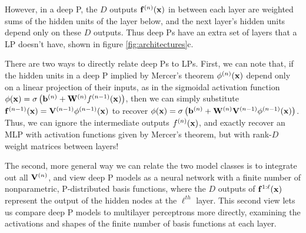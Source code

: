 \documentclass[twoside]{article}
\makeatletter
\newlength{\nonHumbleHeight}
\def\@humbleformat#1{{\settoheight{\nonHumbleHeight}{#1}\resizebox{!}{0.94\nonHumbleHeight}{#1}}}%
\def\humble#1{\@humbleformat{#1}}%
\newcommand{\gp}{{\humble GP}}
\newcommand{\MLP}{{\humble MLP}}
\makeatother
\begin{document}
However, in a deep \gp{}, the $D$ outputs ${\bf{f}}^{(n)}({\bf{x}})$ in between each layer are weighted sums of the hidden units of the layer below, and the next layer's hidden units depend only on these $D$ outputs.  Thus deep \gp{}s have an extra set of layers that a \MLP{} doesn't have, shown in figure \ref{fig:architectures}c.

There are two ways to directly relate deep \gp{}s to \MLP{}s.  First, we can note that, if the hidden units in a deep \gp{} implied by Mercer's theorem $\phi^{(n)}({\bf{x}})$ depend only on a linear projection of their inputs, as in the sigmoidal activation function $\phi({\bf{x}}) = \sigma \left( {\bf{b}}^{(n)} + \mathbf{W}^{(n)}f^{(n-1)}({\bf{x}}) \right)$, then we can simply substitute ${\bf{f}}^{(n-1)}({\bf{x}}) = \mathbf{V}^{(n-1)} \phi^{(n-1)}({\bf{x}})$ to recover $\phi({\bf{x}}) = \sigma \left( {\bf{b}}^{(n)} + \mathbf{W}^{(n)} \mathbf{V}^{(n-1)} \phi^{(n-1)}({\bf{x}}) \right)$.  Thus, we can ignore the intermediate outputs $f^{(n)}({\bf{x}})$, and exactly recover an MLP with activation functions given by Mercer's theorem, but with rank-$D$ weight matrices 
 between layers!

The second, more general way we can relate the two model classes is to integrate out all $\mathbf{V}^{(n)}$, and view deep \gp{} models as a neural network with a finite number of nonparametric, \gp{}-distributed basis functions, where the $D$ outputs of ${\bf{f}}^{1:\ell}({\bf{x}})$ represent the output of the hidden nodes at the $\ell^{th}$ layer.
%
This second view lets us compare deep \gp{} models to multilayer perceptrons more directly, examining the activations and shapes of the finite number of basis functions at each layer.

%
%

\end{document}
